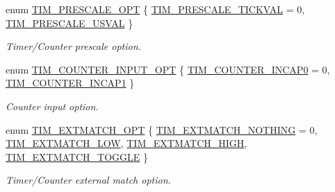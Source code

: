 \begin{DoxyCompactItemize}
enum \hyperlink{group___t_i_m___public___types_gac736309e96b25f5f63cdb5418131dc18}{\-T\-I\-M\-\_\-\-P\-R\-E\-S\-C\-A\-L\-E\-\_\-\-O\-P\-T} \{ \hyperlink{group___t_i_m___public___types_ggac736309e96b25f5f63cdb5418131dc18a3805cb9cacbd1617b64afcce27d31b0f}{\-T\-I\-M\-\_\-\-P\-R\-E\-S\-C\-A\-L\-E\-\_\-\-T\-I\-C\-K\-V\-A\-L} =  0, 
\hyperlink{group___t_i_m___public___types_ggac736309e96b25f5f63cdb5418131dc18ab55346341a62e2f5bc5f2be410e7ab5c}{\-T\-I\-M\-\_\-\-P\-R\-E\-S\-C\-A\-L\-E\-\_\-\-U\-S\-V\-A\-L}
 \}
\begin{DoxyCompactList}\small\item\em \-Timer/\-Counter prescale option. \end{DoxyCompactList}\item 
enum \hyperlink{group___t_i_m___public___types_ga1233168d247f0633970dfaf040acf5a3}{\-T\-I\-M\-\_\-\-C\-O\-U\-N\-T\-E\-R\-\_\-\-I\-N\-P\-U\-T\-\_\-\-O\-P\-T} \{ \hyperlink{group___t_i_m___public___types_gga1233168d247f0633970dfaf040acf5a3a8af1ce506582d919df169043f10ae405}{\-T\-I\-M\-\_\-\-C\-O\-U\-N\-T\-E\-R\-\_\-\-I\-N\-C\-A\-P0} =  0, 
\hyperlink{group___t_i_m___public___types_gga1233168d247f0633970dfaf040acf5a3a91bc758b31260c54df5628e17ae9ab8c}{\-T\-I\-M\-\_\-\-C\-O\-U\-N\-T\-E\-R\-\_\-\-I\-N\-C\-A\-P1}
 \}
\begin{DoxyCompactList}\small\item\em \-Counter input option. \end{DoxyCompactList}\item 
enum \hyperlink{group___t_i_m___public___types_ga08bf1adf0884db3eb03d0a63c8bac082}{\-T\-I\-M\-\_\-\-E\-X\-T\-M\-A\-T\-C\-H\-\_\-\-O\-P\-T} \{ \hyperlink{group___t_i_m___public___types_gga08bf1adf0884db3eb03d0a63c8bac082a7d8f851739f573d66b9ddd53fe588831}{\-T\-I\-M\-\_\-\-E\-X\-T\-M\-A\-T\-C\-H\-\_\-\-N\-O\-T\-H\-I\-N\-G} =  0, 
\hyperlink{group___t_i_m___public___types_gga08bf1adf0884db3eb03d0a63c8bac082a39251e447da4b1a7d7bd5b02f2e69490}{\-T\-I\-M\-\_\-\-E\-X\-T\-M\-A\-T\-C\-H\-\_\-\-L\-O\-W}, 
\hyperlink{group___t_i_m___public___types_gga08bf1adf0884db3eb03d0a63c8bac082a415d4d197ac413b1e20fbf91603f9bef}{\-T\-I\-M\-\_\-\-E\-X\-T\-M\-A\-T\-C\-H\-\_\-\-H\-I\-G\-H}, 
\hyperlink{group___t_i_m___public___types_gga08bf1adf0884db3eb03d0a63c8bac082afe631d16a4a16c70027a82773f7ad3d7}{\-T\-I\-M\-\_\-\-E\-X\-T\-M\-A\-T\-C\-H\-\_\-\-T\-O\-G\-G\-L\-E}
 \}
\begin{DoxyCompactList}\small\item\em \-Timer/\-Counter external match option. \end{DoxyCompactList}\item 

\end{DoxyCompactItemize}
